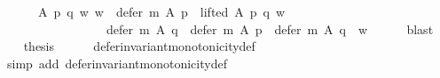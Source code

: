 \begin{isabellebody}
\ \ \ \ \ \ {\isacharparenleft}{\kern0pt}{\isasymforall}A\ p\ q\ w{\isachardot}{\kern0pt}\ {\isacharparenleft}{\kern0pt}w\ {\isasymin}\ defer\ {\isacharparenleft}{\kern0pt}m{\isasymdown}{\isacharparenright}{\kern0pt}\ A\ p\ {\isasymand}\ lifted\ A\ p\ q\ w{\isacharparenright}{\kern0pt}\ {\isasymlongrightarrow}\isanewline
\ \ \ \ \ \ \ \ \ \ \ \ \ \ \ \ \ {\isacharparenleft}{\kern0pt}defer\ {\isacharparenleft}{\kern0pt}m{\isasymdown}{\isacharparenright}{\kern0pt}\ A\ q\ {\isacharequal}{\kern0pt}\ defer\ {\isacharparenleft}{\kern0pt}m{\isasymdown}{\isacharparenright}{\kern0pt}\ A\ p\ {\isasymor}\ defer\ {\isacharparenleft}{\kern0pt}m{\isasymdown}{\isacharparenright}{\kern0pt}\ A\ q\ {\isacharequal}{\kern0pt}\ {\isacharbraceleft}{\kern0pt}w{\isacharbraceright}{\kern0pt}{\isacharparenright}{\kern0pt}{\isacharparenright}{\kern0pt}{\isachardoublequoteclose}\isanewline
\ \ \ \ \isamarkupfalse%
\ blast\isanewline
\ \ \isamarkupfalse%
\ {\isacharquery}{\kern0pt}thesis\isanewline
\ \ \ \ \isamarkupfalse%
\ defer{\isacharunderscore}{\kern0pt}invariant{\isacharunderscore}{\kern0pt}monotonicity{\isacharunderscore}{\kern0pt}def\isanewline
\ \ \ \ \isamarkupfalse%
\ {\isacharparenleft}{\kern0pt}simp\ add{\isacharcolon}{\kern0pt}\ defer{\isacharunderscore}{\kern0pt}invariant{\isacharunderscore}{\kern0pt}monotonicity{\isacharunderscore}{\kern0pt}def{\isacharparenright}{\kern0pt}\isanewline
{}\isamarkupfalse%
%
\endisatagproof
{\isafoldproof}%
%
\isadelimproof
\isanewline
%
\endisadelimproof
%
\isadelimtheory
\isanewline
%
\endisadelimtheory
%
\isatagtheory
{}\isamarkupfalse%
%
\endisatagtheory
{\isafoldtheory}%
%
\isadelimtheory
%
\endisadelimtheory
%
\end{isabellebody}%
\endinput
